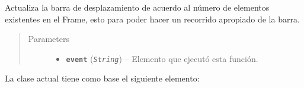 \documentclass[class=report, crop=false]{standalone}
\begin{document}
\begin{fulllineitems}
\begin{fulllineitems}
Actualiza la barra de desplazamiento de acuerdo al 
número de elementos existentes en el Frame, esto 
para poder hacer un recorrido apropiado de la barra.

\begin{quote}\begin{description}
\item[{Parameters}] \leavevmode\begin{itemize}
\item\textbf{\texttt{event}} (\emph{\texttt{String}}) -- Elemento que ejecutó esta función.
\end{itemize}
\end{description}\end{quote}

\end{fulllineitems}

\end{fulllineitems}

La clase actual tiene como base el siguiente elemento:
\end{document}
